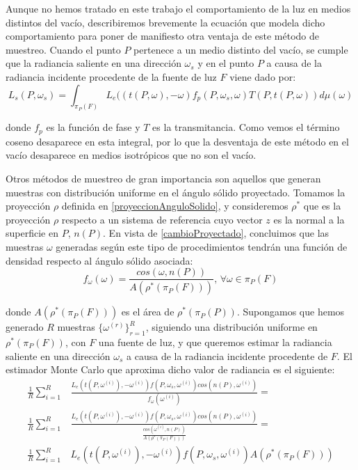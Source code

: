 Aunque no hemos tratado en este trabajo el comportamiento de la luz en medios distintos del vacío, describiremos brevemente la ecuación que modela dicho comportamiento para poner de manifiesto otra ventaja de este método de muestreo. Cuando el punto $P$ pertenece a un medio distinto del vacío, se cumple que la radiancia saliente en una dirección $\omega_s$ y en el punto $P$ a causa de la radiancia incidente procedente de la fuente de luz $F$ viene dado por:
$$L_s(P, \omega_s) = \int_{\pi_P(F)} L_e((t(P,\omega), -\omega) f_p(P,\omega_s, \omega) T(P,t(P,\omega)) d\mu(\omega)$$

donde $f_p$ es la función de fase y $T$ es la transmitancia. Como vemos el término coseno desaparece en esta integral, por lo que la desventaja de este método en el vacío desaparece en medios isotrópicos que no son el vacío. 

Otros métodos de muestreo de gran importancia son aquellos que generan muestras con distribución uniforme en el ángulo sólido proyectado. Tomamos la proyección $\rho$ definida en \ref{proyeccionAnguloSolido}, y consideremos $\rho^*$ que es la proyección $\rho$ respecto a un sistema de referencia cuyo vector $z$ es la normal a la superficie en $P$, $n(P)$. En vista de \ref{cambioProyectado}, concluimos que las muestras $\omega$ generadas según este tipo de procedimientos tendrán una función de densidad respecto al ángulo sólido asociada:
$$f_{\omega}(\omega) = \frac{cos(\omega , n(P))}{A(\rho^*(\pi_P(F)))}\text{, }\forall \omega\in\pi_P(F)$$

donde $A(\rho^*(\pi_P(F)))$ es el área de $\rho^*(\pi_P(P))$. Supongamos que hemos generado $R$ muestras $\{\omega^{(r)}\}_{r=1}^R$, siguiendo una distribución uniforme en $\rho^*(\pi_P(F))$, con $F$ una fuente de luz, y que queremos estimar la radiancia saliente en una dirección $\omega_s$ a causa de la radiancia incidente procedente de $F$. El estimador Monte Carlo que aproxima dicho valor de radiancia es el siguiente:
\begin{align*}
\frac{1}{R}\sum_{i=1}^R&\frac{L_e(t(P,\omega^{(i)}),-\omega^{(i)}) f(P,\omega_s,\omega^{(i)}) cos(n(P),\omega^{(i)}) }{f_{\omega}(\omega^{(i)})} = \\
\frac{1}{R}\sum_{i=1}^R&\frac{L_e(t(P,\omega^{(i)}),-\omega^{(i)}) f(P,\omega_s,\omega^{(i)}) cos(n(P),\omega^{(i)}) }{\frac{cos(\omega^{(i)} , n(P))}{A(\rho^*(\pi_P(F)))}} = \\
\frac{1}{R}\sum_{i=1}^R&L_e(t(P,\omega^{(i)}),-\omega^{(i)}) f(P,\omega_s,\omega^{(i)})  A(\rho^*(\pi_P(F)))
\end{align*}

